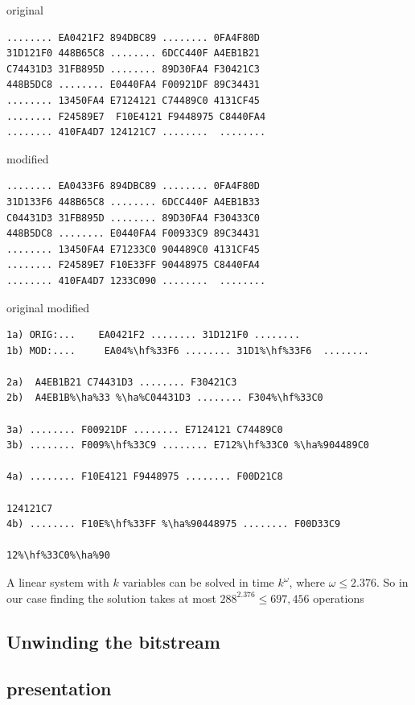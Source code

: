 \documentclass[conference]{IEEEtran}
\begin{document}
original
\begin{lstlisting}[style=hex]
........ EA0421F2 894DBC89 ........ 0FA4F80D
31D121F0 448B65C8 ........ 6DCC440F A4EB1B21
C74431D3 31FB895D ........ 89D30FA4 F30421C3
448B5DC8 ........ E0440FA4 F00921DF 89C34431
........ 13450FA4 E7124121 C74489C0 4131CF45
........ F24589E7  F10E4121 F9448975 C8440FA4
........ 410FA4D7 124121C7 ........  ........
\end{lstlisting}

modified
\begin{lstlisting}[style=hex]
........ EA0433F6 894DBC89 ........ 0FA4F80D 
31D133F6 448B65C8 ........ 6DCC440F A4EB1B33
C04431D3 31FB895D ........ 89D30FA4 F30433C0 
448B5DC8 ........ E0440FA4 F00933C9 89C34431
........ 13450FA4 E71233C0 904489C0 4131CF45
........ F24589E7 F10E33FF 90448975 C8440FA4 
........ 410FA4D7 1233C090 ........  ........
\end{lstlisting}



original
modified
\newcommand{\hf}{\makebox[0pt][l]{\color{green}\rule[-3pt]{0.08\linewidth}{11pt}}}
\newcommand{\ha}{\makebox[0pt][l]{\color{green}\rule[-3pt]{0.04\linewidth}{11pt}}}

\begin{lstlisting}[style=hex,escapechar=\%]
1a) ORIG:...    EA0421F2 ........ 31D121F0 ........
1b) MOD:....     EA04%\hf%33F6 ........ 31D1%\hf%33F6  ........

2a)  A4EB1B21 C74431D3 ........ F30421C3
2b)  A4EB1B%\ha%33 %\ha%C04431D3 ........ F304%\hf%33C0

3a) ........ F00921DF ........ E7124121 C74489C0
3b) ........ F009%\hf%33C9 ........ E712%\hf%33C0 %\ha%904489C0 

4a) ........ F10E4121 F9448975 ........ F00D21C8

124121C7
4b) ........ F10E%\hf%33FF %\ha%90448975 ........ F00D33C9

12%\hf%33C0%\ha%90
\end{lstlisting}

A linear system with $k$ variables can be solved in time $k^\omega$, where $\omega \leq 2.376$.
So in our case finding the solution takes at most $288^{2.376} \leq 697,456$ operations


\subsection{Unwinding the bitstream}


\subsection{presentation}
\end{document}
